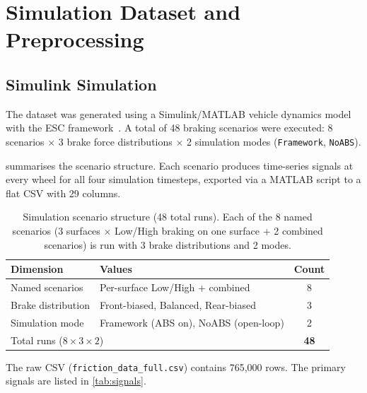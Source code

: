 \documentclass[11pt,a4paper]{article}
\begin{document}
\section{Simulation Dataset and Preprocessing}
\label{sec:data}

\subsection{Simulink Simulation}

The dataset was generated using a Simulink/MATLAB vehicle dynamics model with
the ESC framework~\cite{hackatonid2026}.
A total of 48 braking scenarios were executed:
8 scenarios $\times$ 3 brake force distributions $\times$ 2 simulation modes
(\texttt{Framework}, \texttt{NoABS}).

 summarises the scenario structure.
Each scenario produces time-series signals at every wheel for all four simulation
timesteps, exported via a MATLAB script to a flat CSV with 29 columns.

\begin{table}[htbp]
  \centering
  \caption{Simulation scenario structure (48 total runs).
           Each of the 8 named scenarios (3 surfaces $\times$ Low/High braking
           on one surface + 2 combined scenarios) is run with 3 brake
           distributions and 2 modes.}
  \label{tab:scenarios}
  \begin{tabular}{llc}
    \toprule
    Dimension & Values & Count \\
    \midrule
    Named scenarios & Per-surface Low/High + combined & 8 \\
    Brake distribution & Front-biased, Balanced, Rear-biased & 3 \\
    Simulation mode & Framework (ABS on), NoABS (open-loop) & 2 \\
    \midrule
    \multicolumn{2}{l}{Total runs ($8 \times 3 \times 2$)} & \textbf{48} \\
    \bottomrule
  \end{tabular}
\end{table}

The raw CSV (\texttt{friction\_data\_full.csv}) contains 765{,}000 rows.
The primary signals are listed in \cref{tab:signals}.
\end{document}
